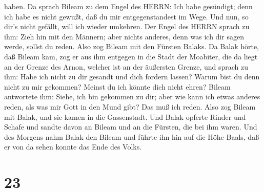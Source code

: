 haben.  Da sprach Bileam zu dem Engel des HERRN: Ich habe
gesündigt; denn ich habe es nicht gewußt, daß du mir entgegenstandest im
Wege. Und nun, so dir's nicht gefällt, will ich wieder umkehren.
 Der Engel des HERRN sprach zu ihm: Zieh hin mit den
Männern; aber nichts anderes, denn was ich dir sagen werde, sollst du
reden. Also zog Bileam mit den Fürsten Balaks.  Da Balak
hörte, daß Bileam kam, zog er aus ihm entgegen in die Stadt der
Moabiter, die da liegt an der Grenze des Arnon, welcher ist an der
äußersten Grenze,  und sprach zu ihm: Habe ich nicht zu dir
gesandt und dich fordern lassen? Warum bist du denn nicht zu mir
gekommen? Meinst du ich könnte dich nicht ehren?  Bileam
antwortete ihm: Siehe, ich bin gekommen zu dir; aber wie kann ich etwas
anderes reden, als was mir Gott in den Mund gibt? Das muß ich reden.
 Also zog Bileam mit Balak, und sie kamen in die
Gassenstadt.  Und Balak opferte Rinder und Schafe und
sandte davon an Bileam und an die Fürsten, die bei ihm waren.
 Und des Morgens nahm Balak den Bileam und führte ihn hin
auf die Höhe Baals, daß er von da sehen konnte das Ende des Volks.

\hypertarget{section-22}{%
\section{23}\label{section-22}}

